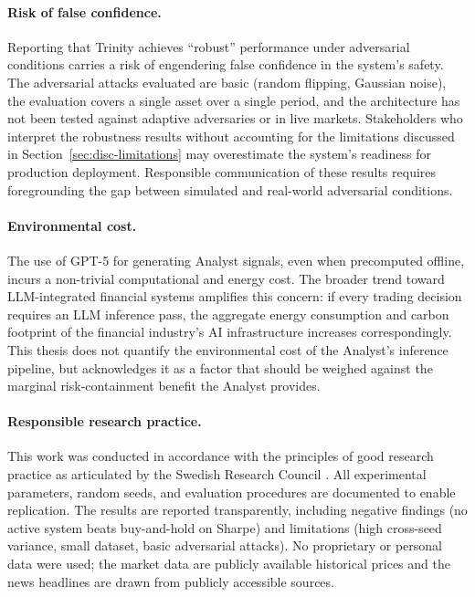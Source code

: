 \paragraph{Risk of false confidence.}
Reporting that Trinity achieves ``robust'' performance under adversarial
conditions carries a risk of engendering false confidence in the system's
safety. The adversarial attacks evaluated are basic (random flipping, Gaussian
noise), the evaluation covers a single asset over a single period, and the
architecture has not been tested against adaptive adversaries or in live
markets. Stakeholders who interpret the robustness results without accounting
for the limitations discussed in Section~\ref{sec:disc-limitations} may
overestimate the system's readiness for production deployment. Responsible
communication of these results requires foregrounding the gap between
simulated and real-world adversarial conditions.

\paragraph{Environmental cost.}
The use of GPT-5 for generating Analyst signals, even when precomputed
offline, incurs a non-trivial computational and energy cost. The broader trend
toward LLM-integrated financial systems amplifies this concern: if every
trading decision requires an LLM inference pass, the aggregate energy
consumption and carbon footprint of the financial industry's AI infrastructure
increases correspondingly. This thesis does not quantify the environmental
cost of the Analyst's inference pipeline, but acknowledges it as a factor that
should be weighed against the marginal risk-containment benefit the Analyst
provides.

\paragraph{Responsible research practice.}
This work was conducted in accordance with the principles of good research
practice as articulated by the Swedish Research Council
\cite{vr2017goodresearchpractice}. All experimental parameters, random seeds,
and evaluation procedures are documented to enable replication. The results
are reported transparently, including negative findings (no active system
beats buy-and-hold on Sharpe) and limitations (high cross-seed variance, small
dataset, basic adversarial attacks). No proprietary or personal data were
used; the market data are publicly available historical prices and the news
headlines are drawn from publicly accessible sources.

